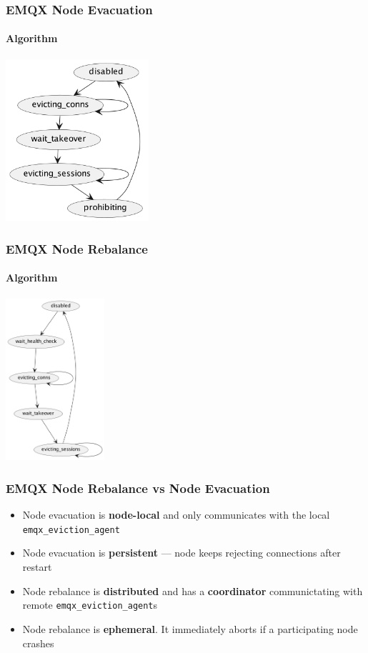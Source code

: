 \documentclass{beamer}
\begin{document}
\begin{frame}
    \frametitle{EMQX Node Evacuation}
    \framesubtitle{Algorithm}
    \begin{center}
        \includegraphics[height=6cm, keepaspectratio]{images/evacuation.png}
    \end{center}
\end{frame}

\begin{frame}
    \frametitle{EMQX Node Rebalance}
    \framesubtitle{Algorithm}
    \begin{center}
        \includegraphics[height=6cm, keepaspectratio]{images/rebalance.png}
    \end{center}
\end{frame}

\begin{frame}
    \frametitle{EMQX Node Rebalance vs Node Evacuation}
    \begin{itemize}
        \item Node evacuation is \textbf{node-local} and only communicates with the local \lstinline{emqx_eviction_agent}
        \item Node evacuation is \textbf{persistent} — node keeps rejecting connections after restart
        \item Node rebalance is \textbf{distributed} and has a \textbf{coordinator} communictating with remote \lstinline{emqx_eviction_agent}s
        \item Node rebalance is \textbf{ephemeral}. It immediately aborts if a participating node crashes
    \end{itemize}
\end{frame}
\end{document}
